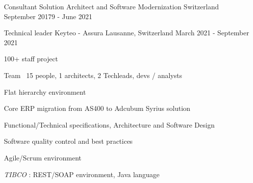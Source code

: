 \begin{cventries}
    \cventry
    {Consultant} %
    {Solution Architect and Software Modernization} %
    {Switzerland} %
    {September 20179 - June 2021} %
    {}%

    \cventry
    {Technical leader} %
    {Keyteo - Assura} %
    {Lausanne, Switzerland} %
    {March 2021 - September 2021} %
    {
        \experience
        {
        \begin{cvitems} %
            \item{100+ staff project}
            \item{Team ~15 people, 1 architects, 2 Techleads, devs / analysts}
            \item{Flat hierarchy environment}
            \item{Core ERP migration from AS400 to Adcubum Syrius solution}
        \end{cvitems}
        }
        {
        \begin{cvitems} %
            \item{Functional/Technical specifications, Architecture and Software Design}
            \item{Software quality control and best practices}
            \item{Agile/Scrum environment}
        \end{cvitems}
        }
        {
        \begin{cvitems} %
            \item{\emph{TIBCO} : REST/SOAP environment, Java language}
        \end{cvitems}
        }
    }
    

\end{cventries}
